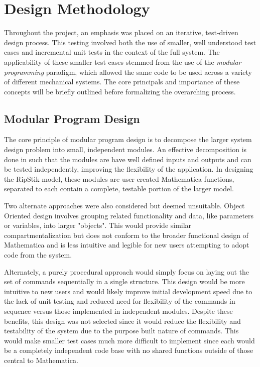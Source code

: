 \section{Design Methodology}
Throughout the project, an emphasis was placed on an iterative, test-driven design process. This testing involved both the use of smaller, well understood test cases and incremental unit tests in the context of the full system. 
The applicability of these smaller test cases stemmed from the use of the \textit{modular programming} paradigm, which allowed the same code to be used across a variety of different mechanical systems. 
The core principals and importance of these concepts will be briefly outlined before formalizing the overarching process.
\subsection{Modular Program Design}
The core principle of modular program design is to decompose the larger system design problem into small, independent modules\cite{Modular}.
An effective decomposition is done in such that the modules are have well defined inputs and outputs and can be tested independently, improving the flexibility of the application\cite{Modular}.
In designing the RipStik model, these modules are user created Mathematica functions, separated to each contain a complete, testable portion of the larger model.

Two alternate approaches were also considered but deemed unsuitable. Object Oriented design involves grouping related functionality and data, like parameters or variables, into larger "objects"\cite{ObjectOriented}.
This would provide similar compartmentalization \cite{ObjectOriented} but does not conform to the broader functional design of Mathematica \cite{MathematicaFunctional} and is less intuitive and legible for new users attempting to adopt code from the system. 

Alternately, a purely procedural approach would simply focus on laying out the set of commands sequentially in a single structure. 
This design would be more intuitive to new users and would likely improve initial development speed due to the lack of unit testing and reduced need for flexibility of the commands in sequence versus those implemented in independent modules.
Despite these benefits, this design was not selected since it would reduce the flexibility and testability of the system due to the purpose built nature of commands. 
This would make smaller test cases much more difficult to implement since each would be a completely independent code base with no shared functions outside of those central to Mathematica.
